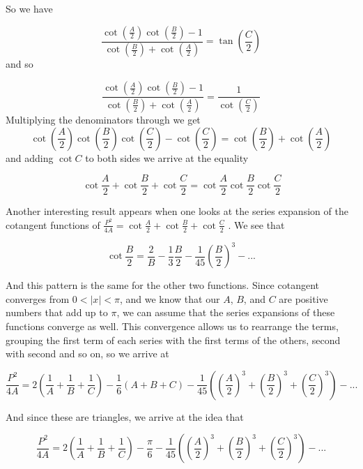 \documentclass[12pt]{report}
\numberwithin{definition}{section}
\begin{document}
 So we have 
 
  \[\frac{\cot{( \frac{A}{2})}\cot{( \frac{B}{2})}-1}{\cot{( \frac{B}{2}
 )+\cot{( \frac{A}{2})}}} = \tan{\left( \frac{C}{2}\right)}\]
  and so 
 
   \[\frac{\cot{( \frac{A}{2})}\cot{( \frac{B}{2})}-1}{\cot{( \frac{B}{2})+\cot{( \frac{A}{2})}}} = \frac{1}{\cot{( \frac{C}{2})}}\]
 Multiplying the denominators through we get 
 \[\cot{ \left(\frac{A}{2}\right)}\cot{\left( \frac{B}{2}\right)}\cot{\left( \frac{C}{2}\right)}-\cot{\left( \frac{C}{2}\right)}= \cot{\left( \frac{B}{2}\right)+\cot{\left( \frac{A}{2}\right)}}\] 
 and adding $\cot{C}$ to both sides we arrive at the equality 
 
  \[\ \cot{\frac{A}{2}}+ \cot{\frac{B}{2}}+ \cot{\frac{C}{2}} = \cot{\frac{A}{2}} \cot{\frac{B}{2}}\cot{\frac{C}{2}}\]
  
 \break
   
 


Another interesting result appears when one looks at the series expansion of the cotangent functions of $\frac{P^2}{4A} = \cot{\frac{A}{2}}+\cot{\frac{B}{2}}+\cot{\frac{C}{2}}$ . We see that 
 
\[\cot{\frac{B}{2}} = \frac{2}{B}-\frac{1}{3}\frac{B}{2}-\frac{1}{45} \left(\frac{B}{2}\right)^3- ...\]
 
 
     
   
   
   
   And this pattern is the same for the other two functions. Since cotangent converges from $0<|x|<\pi$, and we know that our $A$, $B$, and $C$ are positive numbers that add up to $\pi$, we can assume that the series expansions of these functions converge as well. This convergence allows us to rearrange the terms, grouping the first term of each series with the first terms of the others, second with second and so on, so we arrive at 
   
   \[
   \frac{P^2}{4A} = 2\left(\frac{1}{A}+\frac{1}{B}+\frac{1}{C}\right)-\frac{1}{6}(A+B+C)-\frac{1}{45}\left(\left(\frac{A}{2}\right)^3+\left(\frac{B}{2}\right)^3+\left(\frac{C}{2}\right)^3\right)-...
   \]
   
   
   And since these are triangles, we arrive at the idea that 
   
     \[
   \frac{P^2}{4A}  = 2\left( \frac {1}{A}+\frac {1}{B}+\frac {1}{C} \right)-\frac{\pi} {6}-\frac{1}{45}\left(\left(\frac{A}{2}\right)^3+\left(\frac{B}{2}\right)^3+\left(\frac{C}{2}\right)^3\right)-...
      \]
   
        
   
\end{document}
